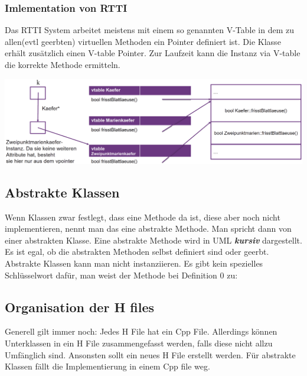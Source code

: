 

\subsubsection{Imlementation von RTTI}

Das RTTI System arbeitet meistens mit einem so genannten V-Table in dem zu allen(evtl geerbten) virtuellen Methoden ein Pointer definiert ist. 
Die Klasse erhält zusätzlich einen V-table Pointer. 
Zur Laufzeit kann die Instanz via V-table die korrekte Methode ermitteln. 

\begin{center}
    \includegraphics[width=\columnwidth]{pictures/dynamic binding v-Table.png}  
\end{center}

\subsection{Abstrakte Klassen}

Wenn Klassen zwar festlegt, dass eine Methode da ist, diese aber noch nicht implementieren, nennt man das eine abstrakte Methode. 
Man spricht dann von einer abstrakten Klasse.
Eine abstrakte Methode wird in UML \textit{\textbf{kursiv}} dargestellt.
Es ist egal, ob die abstrakten Methoden selbst definiert sind oder geerbt. 
Abstrakte Klassen kann man nicht instanziieren.
Es gibt kein spezielles Schlüsselwort dafür, man weist der Methode bei Definition 0 zu: 



\subsection{Organisation der H files}

Generell gilt immer noch: Jedes H File hat ein Cpp File. 
Allerdings können Unterklassen in ein H File zusammengefasst werden, falls diese nicht allzu Umfänglich sind. 
Ansonsten sollt ein neues H File erstellt werden. 
Für abstrakte Klassen fällt die Implementierung in einem Cpp file weg.

